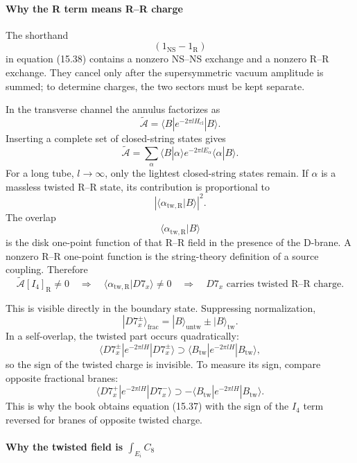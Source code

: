 \documentclass[
  10pt,
  a4paper,
  openany]{book}
\begin{document}
\paragraph{Why the R term means R--R
charge}\label{why-the-r-term-means-rr-charge}

The shorthand \[
(1_{\mathrm{NS}}-1_{\mathrm R})
\] in equation (15.38) contains a nonzero NS--NS exchange and a nonzero
R--R exchange. They cancel only after the supersymmetric vacuum
amplitude is summed; to determine charges, the two sectors must be kept
separate.

In the transverse channel the annulus factorizes as \[
\widetilde{\mathcal A}
=
\langle B|
e^{-2\pi lH_{\mathrm{cl}}}
|B\rangle.
\] Inserting a complete set of closed-string states gives \[
\widetilde{\mathcal A}
=
\sum_{\alpha}
\langle B|\alpha\rangle
e^{-2\pi lE_\alpha}
\langle\alpha|B\rangle.
\] For a long tube, \(l\to\infty\), only the lightest closed-string
states remain. If \(\alpha\) is a massless twisted R--R state, its
contribution is proportional to \[
\left|
\langle\alpha_{\mathrm{tw,R}}|B\rangle
\right|^2.
\] The overlap \[
\langle\alpha_{\mathrm{tw,R}}|B\rangle
\] is the disk one-point function of that R--R field in the presence of
the D-brane. A nonzero R--R one-point function is the string-theory
definition of a source coupling. Therefore \[
\boxed{
\widetilde{\mathcal A}[I_4]_{\mathrm R}\neq0
\quad\Longrightarrow\quad
\langle\alpha_{\mathrm{tw,R}}|D7_x\rangle\neq0
\quad\Longrightarrow\quad
D7_x\text{ carries twisted R--R charge}.
}
\]

This is visible directly in the boundary state. Suppressing
normalization, \[
|D7_x^\pm\rangle_{\mathrm{frac}}
=
|B\rangle_{\mathrm{untw}}
\pm
|B\rangle_{\mathrm{tw}}.
\] In a self-overlap, the twisted part occurs quadratically: \[
\langle D7_x^\pm|
e^{-2\pi lH}
|D7_x^\pm\rangle
\supset
\langle B_{\mathrm{tw}}|
e^{-2\pi lH}
|B_{\mathrm{tw}}\rangle,
\] so the sign of the twisted charge is invisible. To measure its sign,
compare opposite fractional branes: \[
\langle D7_x^+|
e^{-2\pi lH}
|D7_x^-\rangle
\supset
-
\langle B_{\mathrm{tw}}|
e^{-2\pi lH}
|B_{\mathrm{tw}}\rangle.
\] This is why the book obtains equation (15.37) with the sign of the
\(I_4\) term reversed for branes of opposite twisted charge.

\paragraph{\texorpdfstring{Why the twisted field is
\(\int_{E_i}C_8\)}{Why the twisted field is \textbackslash int\_\{E\_i\}C\_8}}\label{why-the-twisted-field-is-int_e_ic_8}
\end{document}
